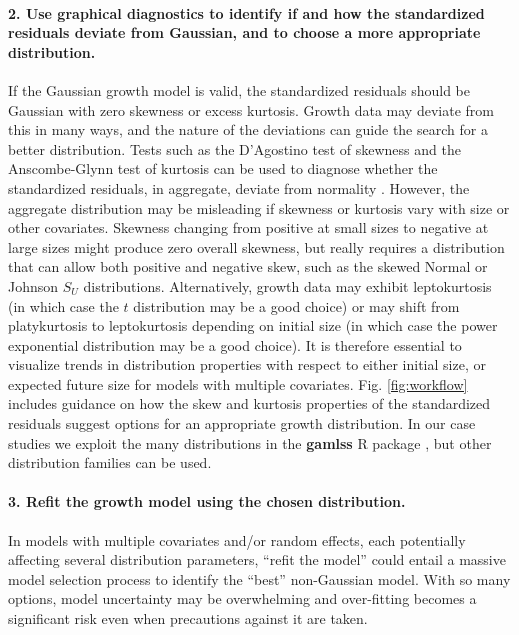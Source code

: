 \documentclass[12pt]{article}
\begin{document}
\begin{spacing}{1.9}
\paragraph{2. Use graphical diagnostics to identify if and how the standardized residuals deviate from Gaussian, and to choose a more appropriate distribution.}
If the Gaussian growth model is valid, the standardized residuals should be Gaussian with zero skewness or excess kurtosis.  
Growth data may deviate from this in many ways, and the nature of the deviations can guide the search for a better distribution. 
Tests such as the D'Agostino test of skewness \citep{d1970transformation} and the Anscombe-Glynn test of kurtosis \citep{anscombe1983distribution} 
can be used to diagnose whether the standardized residuals, in aggregate, deviate from normality \citep{komsta2015moments}. 
However, the aggregate distribution may be misleading if skewness or kurtosis vary with size or other covariates. 
Skewness changing from positive at small sizes to negative at large sizes might produce zero overall skewness, but really requires a distribution that can allow both positive and negative skew, such as the skewed Normal or Johnson $S_{U}$ distributions. 
Alternatively, growth data may exhibit leptokurtosis (in which case the $t$ distribution may be a good choice) or may shift from platykurtosis to leptokurtosis depending on initial size (in which case the power exponential distribution may be a good choice). 
It is therefore essential to visualize trends in distribution properties with respect to either initial size, or expected future size for models with multiple covariates.  
Fig. \ref{fig:workflow} includes guidance on how the skew and kurtosis properties of the standardized residuals suggest options for an appropriate growth distribution. 
In our case studies we exploit the many distributions in the \textbf{gamlss} R package \citep{stasinopoulos2007generalized}, but other distribution families can be used.  

\paragraph{3. Refit the growth model using the chosen distribution.}
In models with multiple covariates and/or random effects, each potentially affecting several distribution parameters, ``refit the model'' could entail a massive model selection process to identify the ``best'' non-Gaussian model. 
With so many options, model uncertainty may be overwhelming and over-fitting becomes a significant risk even when precautions against it are taken. 


\end{spacing}
\end{document}
